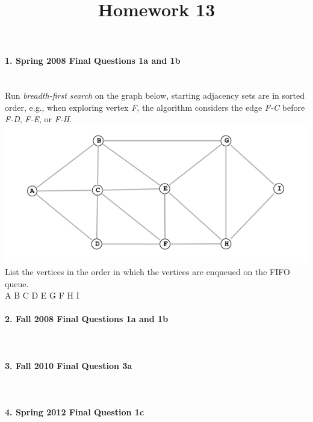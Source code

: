 \documentclass{article}
\begin{document}
\title{Homework 13}
\date{}
\maketitle


\paragraph{\Large 1. Spring 2008 Final Questions 1a and 1b}\mbox{}\\
Run \textit{breadth-first search} on the graph below, starting adjacency sets are in sorted order, e.g., when exploring vertex \textit{F}, the algorithm considers the edge \textit{F-C} before \textit{F-D}, \textit{F-E}, or \textit{F-H}.\\

\includegraphics[width=\linewidth]{fin-f09-2a}\\

\noindent List the vertices in the order in which the vertices are enqueued on the FIFO queue.\\

A B C D E G F H I


\paragraph{\Large 2. Fall 2008 Final Questions 1a and 1b}\mbox{}\\


\paragraph{\Large 3. Fall 2010 Final Question 3a}\mbox{}\\


\paragraph{\Large 4. Spring 2012 Final Question 1c}\mbox{}\\
\end{document}
